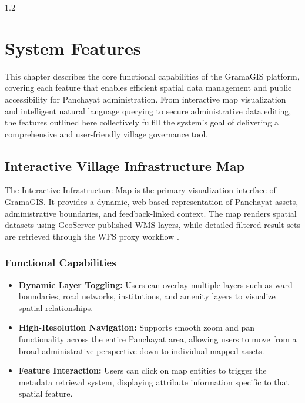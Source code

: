 ﻿\newpage
\thispagestyle{empty}
%
\begin{spacing}{1.2}
%
\chapter{System Features}

This chapter describes the core functional capabilities of the GramaGIS platform, covering each feature that enables efficient spatial data management and public accessibility for Panchayat administration. From interactive map visualization and intelligent natural language querying to secure administrative data editing, the features outlined here collectively fulfill the system's goal of delivering a comprehensive and user-friendly village governance tool.

\section{Interactive Village Infrastructure Map}

The Interactive Infrastructure Map is the primary visualization interface of GramaGIS. It provides a dynamic, web-based representation of Panchayat assets, administrative boundaries, and feedback-linked context. The map renders spatial datasets using GeoServer-published WMS layers, while detailed filtered result sets are retrieved through the WFS proxy workflow \cite{fu2020webgis}.

\subsection*{Functional Capabilities}

\begin{itemize}
\item \textbf{Dynamic Layer Toggling:} Users can overlay multiple layers such as ward boundaries, road networks, institutions, and amenity layers to visualize spatial relationships.

\item \textbf{High-Resolution Navigation:} Supports smooth zoom and pan functionality across the entire Panchayat area, allowing users to move from a broad administrative perspective down to individual mapped assets.

\item \textbf{Feature Interaction:} Users can click on map entities to trigger the metadata retrieval system, displaying attribute information specific to that spatial feature.
\end{itemize}


\end{spacing}
